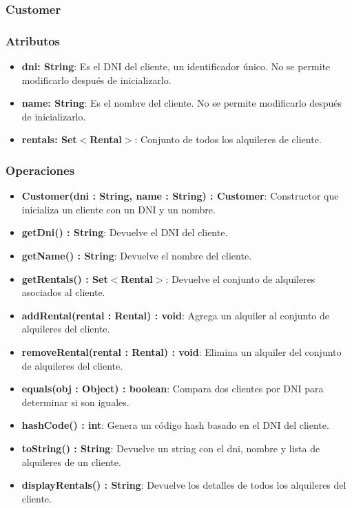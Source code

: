 \subsubsection{Customer}

\subsubsection*{Atributos}

\begin{itemize}
    \item \textbf{dni: String}: Es el DNI del cliente, un identificador único. No se permite modificarlo después de inicializarlo.
    \item \textbf{name: String}: Es el nombre del cliente. No se permite modificarlo después de inicializarlo.
    \item \textbf{rentals: Set$<$Rental$>$}: Conjunto de todos los alquileres de cliente.
\end{itemize}

\subsubsection*{Operaciones}

\begin{itemize}
    \item \textbf{Customer(dni : String, name : String) : Customer}: Constructor que inicializa un cliente con un DNI y un nombre.
    \item \textbf{getDni() : String}: Devuelve el DNI del cliente.
    \item \textbf{getName() : String}: Devuelve el nombre del cliente.
    \item \textbf{getRentals() : Set$<$Rental$>$}: Devuelve el conjunto de alquileres asociados al cliente.
    \item \textbf{addRental(rental : Rental) : void}: Agrega un alquiler al conjunto de alquileres del cliente.
    \item \textbf{removeRental(rental : Rental) : void}: Elimina un alquiler del conjunto de alquileres del cliente.
    \item \textbf{equals(obj : Object) : boolean}: Compara dos clientes por DNI para determinar si son iguales.
    \item \textbf{hashCode() : int}: Genera un código hash basado en el DNI del cliente.
    \item \textbf{toString() : String}: Devuelve un string con el dni, nombre y lista de alquileres de un cliente.
    \item \textbf{displayRentals() : String}: Devuelve los detalles de todos los alquileres del cliente.
\end{itemize}


